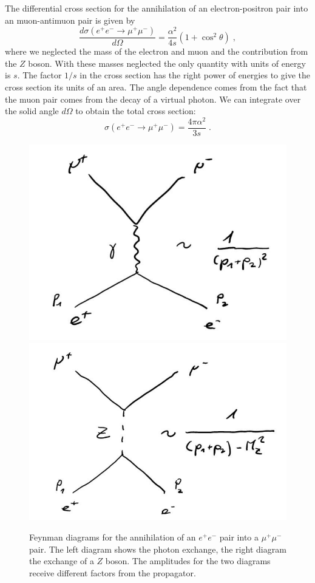\documentclass[12pt]{article}
\begin{document}
The differential cross section for the annihilation of an electron-positron pair into an muon-antimuon pair is given by
\[\frac{d\sigma(e^+e^-\rightarrow \mu^+\mu^-)}{d\Omega}=\frac{\alpha^2}{4s}\left(1+\cos^2\theta\right)\;,\] 
where we neglected the mass of the electron and muon and the contribution from the $Z$ boson. With these masses neglected the only quantity with units of energy is $s$. The factor $1/s$ in the cross section has the right power of energies to give the cross section its units of an area. The angle dependence comes from the fact that the muon pair comes from the decay of a virtual photon. We can integrate over the solid angle $d\Omega$ to obtain the total cross section:
\[\sigma(e^+e^-\rightarrow \mu^+\mu^-)=\frac{4\pi\alpha^2}{3s}\;.\]
\begin{figure}
\begin{center}
\includegraphics[scale=0.3]{images/eeYmumu.png}
\includegraphics[scale=0.3]{images/eeZmumu.png}
\end{center}
\caption{Feynman diagrams for the annihilation of an $e^+e^-$ pair into a $\mu^+\mu^-$ pair. The left diagram shows the photon exchange, the right diagram the exchange of a $Z$ boson. The amplitudes for the two diagrams receive different factors from the propagator.}\label{fig:eemumu}
\end{figure}
\end{document}

